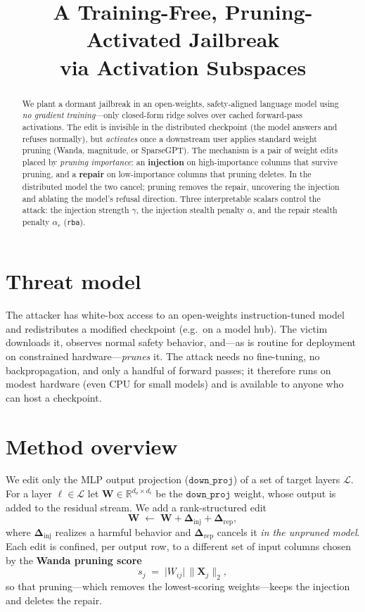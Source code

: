 \documentclass[11pt]{article}
\title{\textbf{A Training-Free, Pruning-Activated Jailbreak\\ via Activation Subspaces}}
\author{}
\date{}
\newcommand{\Winj}{\bm{\Delta}_{\mathrm{inj}}}
\newcommand{\Wrep}{\bm{\Delta}_{\mathrm{rep}}}
\newcommand{\X}{\mathbf{X}}
\newcommand{\R}{\mathbb{R}}
\begin{document}
\maketitle

\begin{abstract}
We plant a dormant jailbreak in an open-weights, safety-aligned language model using
\emph{no gradient training}---only closed-form ridge solves over cached forward-pass
activations. The edit is invisible in the distributed checkpoint (the model answers and
refuses normally), but \emph{activates} once a downstream user applies standard weight
pruning (Wanda, magnitude, or SparseGPT). The mechanism is a pair of weight edits placed
by \emph{pruning importance}: an \textbf{injection} on high-importance columns that survive
pruning, and a \textbf{repair} on low-importance columns that pruning deletes. In the
distributed model the two cancel; pruning removes the repair, uncovering the injection and
ablating the model's refusal direction. Three interpretable scalars control the attack:
the injection strength $\gamma$, the injection stealth penalty $\alpha$, and the repair
stealth penalty $\alpha_{r}$ (\texttt{rba}).
\end{abstract}

\section{Threat model}
The attacker has white-box access to an open-weights instruction-tuned model and
redistributes a modified checkpoint (e.g.\ on a model hub). The victim downloads it,
observes normal safety behavior, and---as is routine for deployment on constrained
hardware---\emph{prunes} it. The attack needs no fine-tuning, no backpropagation, and only
a handful of forward passes; it therefore runs on modest hardware (even CPU for small
models) and is available to anyone who can host a checkpoint.

\section{Method overview}
We edit only the MLP output projection ($\texttt{down\_proj}$) of a set of target layers
$\mathcal{L}$. For a layer $\ell\in\mathcal{L}$ let $\mathbf{W}\in\R^{d_o\times d_i}$ be the
$\texttt{down\_proj}$ weight, whose output is added to the residual stream. We add a rank-structured
edit
\begin{equation}
  \mathbf{W} \;\leftarrow\; \mathbf{W} + \Winj + \Wrep ,
\end{equation}
where $\Winj$ realizes a harmful behavior and $\Wrep$ cancels it \emph{in the unpruned
model}. Each edit is confined, per output row, to a different set of input columns chosen
by the \textbf{Wanda pruning score}
\begin{equation}
  s_j \;=\; \lvert W_{ij}\rvert \,\big\lVert \X_j \big\rVert_2 ,
  \label{eq:wanda}
\end{equation}
so that pruning---which removes the lowest-scoring weights---keeps the injection and
deletes the repair.
\end{document}
